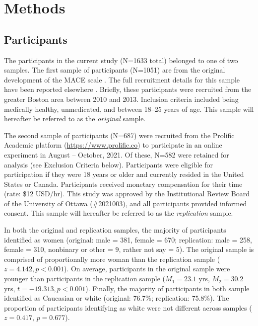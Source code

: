 \documentclass[letterpaper,man,natbib]{apa6}  %
\begin{document}

\section{Methods}

\subsection{Participants}

The participants in the current study (N=1633 total) belonged to one of two samples. The first sample of participants (N=1051) are from the original development of the MACE scale \citep{teicher2015maltreatment}. The full recruitment details for this sample have been reported elsewhere \citep{teicher2015maltreatment}. Briefly, these participants were recruited from the greater Boston area between 2010 and 2013. Inclusion criteria included being medically healthy, unmedicated, and between 18–25 years of age.  This sample will hereafter be referred to as the \textit{original} sample. 

The second sample of participants (N=687) were recruited from the Prolific Academic platform (\url{https://www.prolific.co}) to participate in an online experiment in August -- October, 2021. Of these, N=582 were retained for analysis (see Exclusion Criteria below). Participants were eligible for participation if they were 18 years or older and currently resided in the United States or Canada. Participants received monetary compensation for their time (rate: \$12 USD/hr). This study was approved by the Institutional Review Board of the University of Ottawa (\#2021003), and all participants provided informed consent. This sample will hereafter be referred to as the \textit{replication} sample. 

In both the original and replication samples, the majority of participants identified as women (original: male = 381, female = 670; replication: male = 258, female = 310, nonbinary or other = 9, rather not say = 5). The original sample is comprised of proportionally more woman than the replication sample ($z = 4.142, p < 0.001$). On average, participants in the original sample were younger than participants in the replication sample ($M_1 = 23.1$ yrs, $M_2 = 30.2$ yrs, $t = -19.313, p < 0.001$). Finally, the majority of participants in both sample identified as Caucasian or white (original: 76.7\%; replication: 75.8\%). The proportion of participants identifying as white were not different across samples ($z = 0.417$, $p = 0.677$). 
\end{document}
